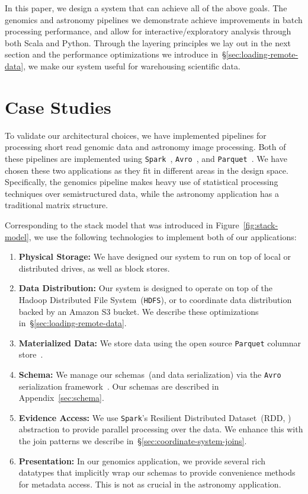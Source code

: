 \documentclass{acm_proc_article-sp}
\begin{document}
In this paper, we design a system that can achieve all of the above goals. The genomics and
astronomy pipelines we demonstrate achieve improvements in batch processing performance, and
allow for interactive/exploratory analysis through both Scala and Python. Through the layering principles
we lay out in the next section and the performance optimizations we introduce
in~\S\ref{sec:loading-remote-data}, we make our system useful for warehousing scientific data.

\section{Case Studies}
\label{sec:case-studies}

To validate our architectural choices, we have implemented pipelines for processing short read genomic
data and astronomy image processing. Both of these pipelines are implemented using
\texttt{Spark}~\cite{zaharia10}, \texttt{Avro}~\cite{avro}, and \texttt{Parquet}~\cite{parquet}. We have chosen these two
applications as they fit in different areas in the design space. Specifically, the genomics pipeline makes
heavy use of statistical processing techniques over semistructured data, while the astronomy application
has a traditional matrix structure.

Corresponding to the stack model that was introduced in Figure~\ref{fig:stack-model}, we use the
following technologies to implement both of our applications:

\begin{enumerate}
\item \textbf{Physical Storage:} We have designed our system to run on top of local or distributed
drives, as well as block stores.
\item \textbf{Data Distribution:} Our system is designed to operate on top of the Hadoop Distributed File \linebreak
System~(\texttt{HDFS}), or to coordinate data distribution \linebreak backed by an Amazon
S3 bucket. We describe these optimizations in~\S\ref{sec:loading-remote-data}.
\item \textbf{Materialized Data:} We store data using the open source \texttt{Parquet} columnar store~\cite{parquet}.
\item \textbf{Schema:} We manage our schemas~(and data serialization) via the \texttt{Avro} serialization
framework~\cite{avro}. Our schemas are described in Appendix~\ref{sec:schema}.
\item \textbf{Evidence Access:} We use \texttt{Spark}'s Resilient \linebreak Distributed Dataset~(RDD, \cite{zaharia12})
abstraction to provide parallel processing over the data. We enhance this with the join patterns we
describe in~\S\ref{sec:coordinate-system-joins}.
\item \textbf{Presentation:} In our genomics application, we provide several rich datatypes that implicitly
wrap our schemas to provide convenience methods for metadata access. This is not as crucial in the
astronomy application.
\end{enumerate}
\end{document}
